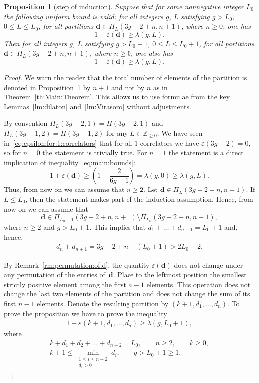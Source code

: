 \documentclass[11pt]{article}
\renewcommand{\epsilon}{\varepsilon}
\newcommand\Z{\mathbb Z}
\newtheorem{Proposition}[Theorem]{Proposition}
\theoremstyle{definition}
\begin{document}
\begin{Proposition}[step of induction] \label{eq:prop:step:of:induction}
Suppose that for some nonnegative integer $L_0$
the following uniform bound is valid:
for all integers $g$, $L$ satisfying $g> L_0$, $0\le L\le L_0$,
for all partitions $\boldsymbol{d}\in\Pi_L(3g-2+n,n+1)$,
where $n\ge 0$, one has
\[
1+\epsilon(\boldsymbol{d})\ge \lambda(g,L) .
\]
Then for all integers $g$, $L$
satisfying $g> L_0+1$,
$0\le L\le L_0+1$,
for all partitions $\boldsymbol{d}\in\Pi_L(3g-2+n,n+1)$,
where $n\ge 0$, one also has
\[
1+\epsilon(\boldsymbol{d})\ge \lambda(g,L) .
\]
\end{Proposition}

\begin{proof}
We warn the reader that the total number of elements of the
partition is denoted in
Proposition~\ref{eq:prop:step:of:induction} by $n+1$ and
not by $n$ as in Theorem~\ref{th:Main:Theorem}. This allows
us to use formulae from the key Lemmas~\ref{lm:dilaton}
and~\ref{lm:Virasoro} without adjustments.

By convention $\Pi_L(3g-2,1)=\Pi(3g-2,1)$ and
$\Pi_L(3g-1,2)=\Pi(3g-1,2)$ for any $L\in\Z_{\ge 0}$.
We have seen in~\eqref{eq:epsilon:for:1:correlators}
that for all $1$-correlators we have
$\epsilon(3g-2)=0$,
so for $n=0$ the statement is trivially true.
For $n=1$ the statement is a direct implication
of inequality~\eqref{eq:main:bounds}:
\[
1+\epsilon(\boldsymbol{d})
\ge \left(1-\frac{2}{6g-1}\right)
=\lambda(g,0)
\ge\lambda(g,L) .
\]
Thus, from now on we can assume that $n\ge 2$. Let $\boldsymbol{d}\in\Pi_L(3g-2+n,n+1)$. If $L\le L_0$, then the statement makes part of the induction assumption. Hence, from now on we can assume that
\[
\boldsymbol{d}\in\Pi_{L_0+1}(3g-2+n,n+1)\setminus\Pi_{L_0}(3g-2+n,n+1) ,
\]
where $n\ge 2$ and $g> L_0+1$. This implies that
$d_1+\dots+d_{n-1}=L_0+1$ and, hence,
\begin{gather*}%
d_{n}+d_{n+1}=3g-2+n-(L_0+1)> 2L_0+2 .
\end{gather*}

By Remark~\ref{rm:permutation:of:d}, the quantity $\epsilon(\boldsymbol{d})$ does not change under any permutation of the entries of~$\boldsymbol{d}$. Place to the leftmost position the smallest strictly positive element among the first $n-1$ elements. This operation does not change the last two elements of the partition and does not change the sum of its first $n-1$ elements. Denote the resulting partition by $(k+1,d_1,\dots,d_n)$. To prove the proposition we have to prove the inequality
\begin{gather}\label{eq:desired:inequality}
1+\epsilon(k+1,d_1,\dots,d_n)\ge \lambda(g,L_0+1) ,
\end{gather}
where
\begin{gather}
k+d_1+d_2+\dots+d_{n-2}=L_0 ,\qquad n\ge 2,\qquad k\ge 0 ,\nonumber\\
 k+1\le\min_{\substack{1\le i\le n-2\\d_i>0}} d_i ,\qquad g>L_0+1\ge 1 .\label{eq:restrictions}
\end{gather}


\end{proof}
\end{document}
